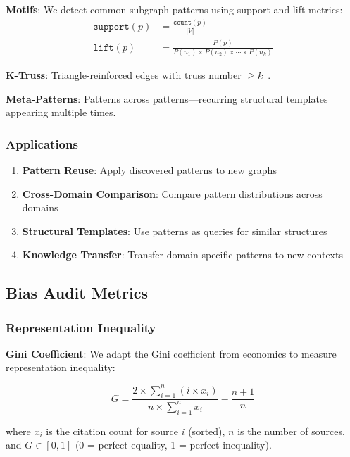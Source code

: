 \documentclass[11pt,twocolumn]{article}
\begin{document}
\textbf{Motifs}: We detect common subgraph patterns using support and lift metrics:
\begin{align}
\texttt{support}(p) &= \frac{\texttt{count}(p)}{|V|} \\
\texttt{lift}(p) &= \frac{P(p)}{P(n_1) \times P(n_2) \times \cdots \times P(n_k)}
\end{align}

\textbf{K-Truss}: Triangle-reinforced edges with truss number $\geq k$~\cite{cohen2008truss}.

\textbf{Meta-Patterns}: Patterns across patterns—recurring structural templates appearing multiple times.

\subsubsection{Applications}

\begin{enumerate}
\item \textbf{Pattern Reuse}: Apply discovered patterns to new graphs
\item \textbf{Cross-Domain Comparison}: Compare pattern distributions across domains
\item \textbf{Structural Templates}: Use patterns as queries for similar structures
\item \textbf{Knowledge Transfer}: Transfer domain-specific patterns to new contexts
\end{enumerate}

\subsection{Bias Audit Metrics}

\subsubsection{Representation Inequality}

\textbf{Gini Coefficient}: We adapt the Gini coefficient from economics to measure representation inequality:

\begin{equation}
G = \frac{2 \times \sum_{i=1}^{n} (i \times x_i)}{n \times \sum_{i=1}^{n} x_i} - \frac{n+1}{n}
\label{eq:gini}
\end{equation}

where $x_i$ is the citation count for source $i$ (sorted), $n$ is the number of sources, and $G \in [0, 1]$ (0 = perfect equality, 1 = perfect inequality).
\end{document}
